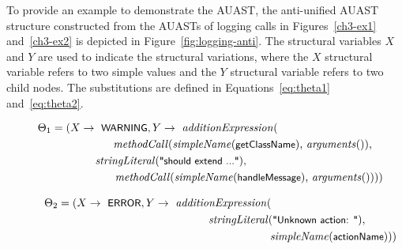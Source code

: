 To provide an example to demonstrate the AUAST, the anti-unified AUAST structure constructed from the AUASTs of logging calls in Figures~\ref{ch3-ex1} and~\ref{ch3-ex2} is depicted in Figure~\ref{fig:logging-anti}. The structural variables $X$ and $Y$ are used to indicate the structural variations, where the $X$ structural variable refers to two simple values and the $Y$ structural variable refers to two child nodes. The substitutions are defined in Equations~\ref{eq:theta1} and~\ref{eq:theta2}.

\begin{align}
\Theta_1 = (X \rightarrow \text{ \textsf{\small WARNING}}, Y \rightarrow \text{ \textit{additionExpression}(}\hspace*{3cm}\nonumber\\
\text{\textit{methodCall}(\textit{simpleName}(\textsf{\small getClassName}), \textit{arguments}()),}\nonumber\\
\text{\textit{stringLiteral}(\textsf{\small "should extend ..."}),}\hspace*{4cm}\nonumber\\
\text{\textit{methodCall}(\textit{simpleName}(\textsf{\small handleMessage}), \textit{arguments}()))})\hspace*{-1em}\label{eq:theta1}
\end{align}

\begin{align}
\Theta_2 = (X \rightarrow \text{ \textsf{\small ERROR}}, Y \rightarrow \text{ \textit{additionExpression}(}\hspace*{3cm}\nonumber\\
\text{\textit{stringLiteral}(\textsf{\small "Unknown action: "})},\nonumber\\
\text{ \textit{simpleName}(\textsf{\small actionName}))})\hspace*{-1cm}\label{eq:theta2}
\end{align}


